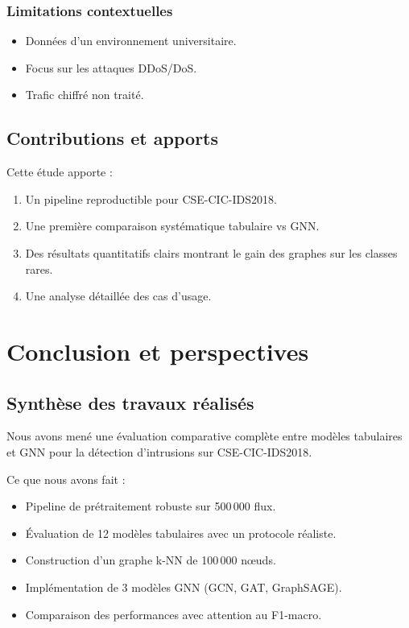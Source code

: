 ﻿\documentclass[11pt,a4paper]{article}
\begin{document}
\subsubsection{Limitations contextuelles}

\begin{itemize}
    \item Données d'un environnement universitaire.
    \item Focus sur les attaques DDoS/DoS.
    \item Trafic chiffré non traité.
\end{itemize}

\subsection{Contributions et apports}

Cette étude apporte :
\begin{enumerate}
    \item Un pipeline reproductible pour CSE-CIC-IDS2018.
    \item Une première comparaison systématique tabulaire vs GNN.
    \item Des résultats quantitatifs clairs montrant le gain des graphes sur les classes rares.
    \item Une analyse détaillée des cas d'usage.
\end{enumerate}

\section{Conclusion et perspectives}
\label{sec:conclusion}

\subsection{Synthèse des travaux réalisés}

Nous avons mené une évaluation comparative complète entre modèles tabulaires et GNN pour la détection d'intrusions sur CSE-CIC-IDS2018.

Ce que nous avons fait :
\begin{itemize}
    \item Pipeline de prétraitement robuste sur 500\,000 flux.
    \item Évaluation de 12 modèles tabulaires avec un protocole réaliste.
    \item Construction d'un graphe k-NN de 100\,000 nœuds.
    \item Implémentation de 3 modèles GNN (GCN, GAT, GraphSAGE).
    \item Comparaison des performances avec attention au F1-macro.\end{itemize}
\end{document}

